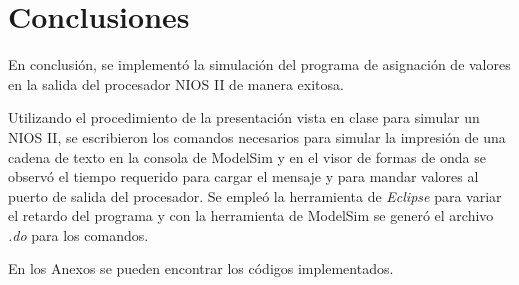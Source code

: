 \section{Conclusiones}
En conclusión, se implementó la simulación del programa de asignación de valores en la salida del procesador NIOS II de manera exitosa.

Utilizando el procedimiento de la presentación vista en clase para simular un NIOS II, se escribieron los comandos necesarios para simular la impresión de una cadena de texto en la consola de ModelSim y en el visor de formas de onda se observó el tiempo requerido para cargar el mensaje y para mandar valores al puerto de salida del procesador. Se empleó la herramienta de \textit{Eclipse} para variar el retardo del programa y con la herramienta de ModelSim se generó el archivo \textit{.do} para los comandos.

En los Anexos se pueden encontrar los códigos implementados.